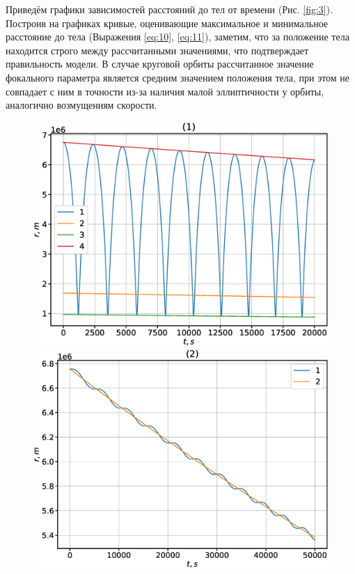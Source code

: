 \documentclass[12pt]{article}
\begin{document}
Приведём графики зависимостей расстояний до тел от времени (Рис. \ref{fig:3}). Построив на графиках кривые, оценивающие максимальное и минимальное
расстояние до тела (Выражения \ref{eq:10}, \ref{eq:11}), заметим, что за положение тела находится строго между рассчитанными значениями, что 
подтверждает правильность модели. В случае круговой орбиты рассчитанное значение фокального параметра является средним значением положения тела,
при этом не совпадает с ним в точности из-за наличия малой эллиптичности у орбиты, аналогично возмущениям скорости.
\begin{figure}[H]
      \includegraphics[width=1.0\linewidth]{r_t_1.eps}
    \endminipage\hfill
      \includegraphics[width=1.0\linewidth]{r_t_2.eps}

\end{figure}
\end{document}
